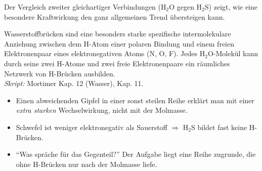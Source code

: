 

Der Vergleich zweiter gleichartiger Verbindungen (H$_2$O gegen H$_2$S)
zeigt, wie eine besondere Kraftwirkung den ganz allgemeinen Trend
übersteigen kann.

\begin{werkzeugkasten}
Wasserstoffbrücken sind eine besonders starke spezifische intermolekulare
Anziehung zwischen dem H-Atom einer polaren Bindung und einem
freien Elektronenpaar eines elektronegativen Atoms (N, O, F).
Jedes H$_2$O-Molekül kann durch seine zwei H-Atome und zwei freie
Elektronenpaare ein räumliches Netzwerk von H-Brücken ausbilden.
\\[2mm]
\textit{Skript:} Mortimer Kap. 12 (Wasser), Kap. 11.
\end{werkzeugkasten}

\begin{achtung}
\begin{itemize}
  \item Einen abweichenden Gipfel in einer sonst steilen Reihe erklärt man mit
        einer \emph{extra starken} Wechselwirkung, nicht mit der Molmasse.
  \item Schwefel ist weniger elektronegativ als Sauerstoff $\Rightarrow$
        H$_2$S bildet fast keine H-Brücken.
  \item ``Was spräche für das Gegenteil?'' Der Aufgabe liegt eine Reihe
        zugrunde, die ohne H-Brücken nur nach der Molmasse liefe.
\end{itemize}
\end{achtung}
